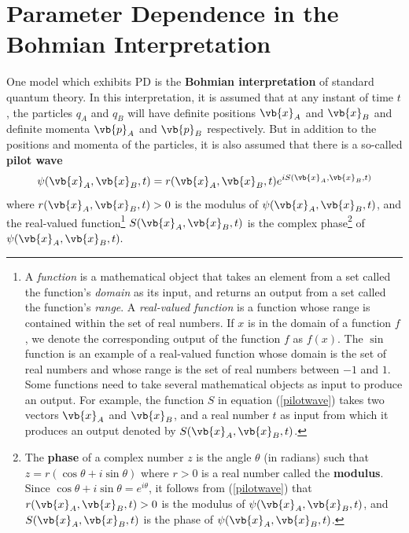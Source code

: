 \documentclass[12pt]{report}
\begin{document}
\section{Parameter Dependence in the Bohmian Interpretation}\label{PI}
One model which exhibits PD is the \textbf{Bohmian interpretation} of standard quantum theory. In this interpretation, it is assumed that at any instant of time $t$, the particles $q_A$ and $q_B$ will have definite positions $\vb{x}_A$ and $\vb{x}_B$ %
%
and definite momenta $\vb{p}_A$ and $\vb{p}_B$ %
%
respectively. But in addition to the positions and momenta of the particles, it is also assumed that there is a so-called \textbf{pilot wave} 
\begin{equation}\label{pilotwave}
\psi(\vb{x}_A, \vb{x}_B, t)=r(\vb{x}_A, \vb{x}_B, t)e^{i S(\vb{x}_A, \vb{x}_B, t)} 
\end{equation}where $r(\vb{x}_A, \vb{x}_B, t)>0$ %
% 
is the modulus of $\psi(\vb{x}_A, \vb{x}_B, t)$, %
%
and the real-valued function\footnote{A \emph{function} is a mathematical object that takes an element from a set called the function's \emph{domain} as its input, and returns an output from a set called the function's \emph{range}. A \emph{real-valued function} is a function whose range is contained within the set of real numbers. If $x$ is in the domain of a function $f$, we denote the corresponding output of the function $f$ as $f(x)$. The $\sin$ function is an example of a real-valued function whose domain is the set of real numbers and whose range is the set of real numbers between $-1$ and $1$. Some functions need to  take several mathematical objects as input to produce an output. For example, the function $S$ in equation (\ref{pilotwave}) takes two vectors $\vb{x}_A$ and $\vb{x}_B$, and a real number $t$ as input from which it produces an output denoted by $S(\vb{x}_A, \vb{x}_B, t)$.} $S(\vb{x}_A, \vb{x}_B,t )$ is %
%
the complex phase\footnote{The \textbf{phase} of a complex number $z$ is the angle $\theta$ (in radians) such that $z=r(\cos \theta + i \sin \theta)$ where $r>0$ is a real number called the \textbf{modulus}. Since $\cos \theta + i\sin \theta=e^{i \theta}$, %
%
it follows from (\ref{pilotwave}) that $r(\vb{x}_A, \vb{x}_B, t)>0$ is the modulus of $\psi(\vb{x}_A, \vb{x}_B, t)$, and $S(\vb{x}_A, \vb{x}_B,t )$ is the phase of $\psi(\vb{x}_A, \vb{x}_B, t)$.} of $\psi(\vb{x}_A, \vb{x}_B, t).$
\end{document}
